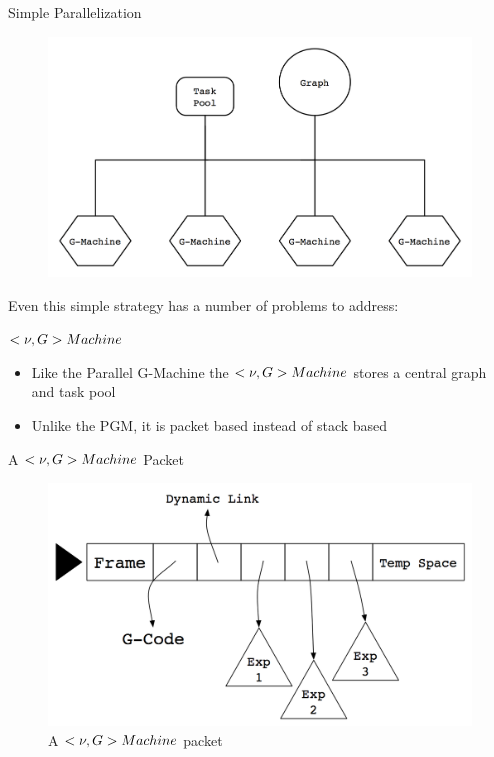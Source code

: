 \documentclass{beamer}
\begin{document}
\begin{frame}{Simple Parallelization}
    \begin{figure}
    \centering
        \includegraphics[scale=.3]{figures/simpleParallel.png}
    \end{figure}


Even this simple strategy has a number of problems to address:
\end{frame}

\begin{frame}{$<\nu, G>\-Machine$ \citep{vGMachine}}
\begin{itemize}
    \item
        Like the Parallel G-Machine the $<\nu, G>\-Machine$ stores a central graph and task pool
    \item
        Unlike the PGM, it is packet based instead of stack based
\end{itemize}
\end{frame}

\begin{frame}{A $<\nu, G>\-Machine$ Packet}

    \begin{figure}
    \centering
        \includegraphics[scale=.3]{figures/packet.png}
        \caption{A $<\nu, G>\-Machine$ packet}
    \end{figure}
\end{frame}
\end{document}
